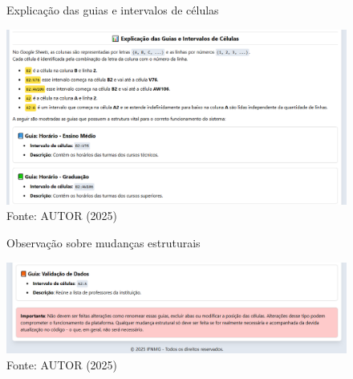 \begin{figure}[htb]
    \centering
    \caption{Explicação das guias e intervalos de células}
    \includegraphics[width=1\textwidth]{Figuras/doc-3.png}
    \caption*{Fonte: AUTOR (2025)}
    \label{fig_doc_3}
\end{figure}

\begin{figure}[htb]
    \centering
    \caption{Observação sobre mudanças estruturais}
    \includegraphics[width=1\textwidth]{Figuras/doc-4.png}
    \caption*{Fonte: AUTOR (2025)}
    \label{fig_doc_4}
\end{figure}